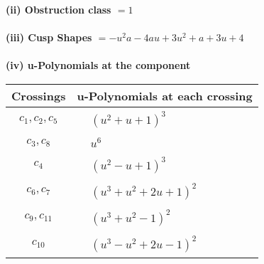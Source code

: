 \documentclass[1p]{elsarticle_modified}
\theoremstyle{definition}
\begin{document}
\flushleft \textbf{(ii) Obstruction class $= 1$}\\~\\
\flushleft \textbf{(iii) Cusp Shapes $= - u^2 a-4 a u+3 u^2+a+3 u+4$}\\~\\
\newpage\renewcommand{\arraystretch}{1}
\flushleft \textbf{(iv) u-Polynomials at the component}\newline \\
\begin{tabular}{m{50pt}|m{274pt}}
Crossings & \hspace{64pt}u-Polynomials at each crossing \\
\hline $$\begin{aligned}c_{1},c_{2},c_{5}\end{aligned}$$&$\begin{aligned}
&(u^2+u+1)^3
\end{aligned}$\\
\hline $$\begin{aligned}c_{3},c_{8}\end{aligned}$$&$\begin{aligned}
&u^6
\end{aligned}$\\
\hline $$\begin{aligned}c_{4}\end{aligned}$$&$\begin{aligned}
&(u^2- u+1)^3
\end{aligned}$\\
\hline $$\begin{aligned}c_{6},c_{7}\end{aligned}$$&$\begin{aligned}
&(u^3+u^2+2 u+1)^2
\end{aligned}$\\
\hline $$\begin{aligned}c_{9},c_{11}\end{aligned}$$&$\begin{aligned}
&(u^3+u^2-1)^2
\end{aligned}$\\
\hline $$\begin{aligned}c_{10}\end{aligned}$$&$\begin{aligned}
&(u^3- u^2+2 u-1)^2
\end{aligned}$\\
\hline
\end{tabular}\\~\\
\end{document}
